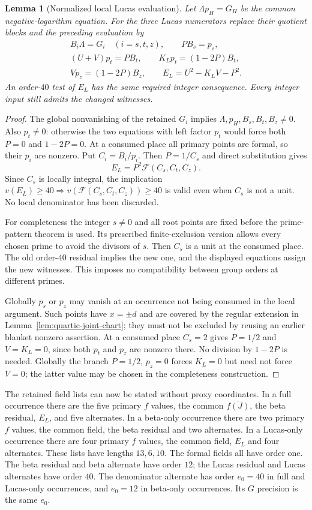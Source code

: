 \documentclass[11pt]{article}
\newtheorem{lemma}[theorem]{Lemma}
\theoremstyle{definition}
\theoremstyle{remark}
\begin{document}
\begin{lemma}[Normalized local Lucas evaluation]
\label{lem:quartic-normalized-lucas}
Let $\Lambda p_H=G_H$ be the common negative-logarithm equation. For the
three Lucas numerators replace their quotient blocks and the preceding
evaluation by
\begin{gather*}
 B_i\Lambda=G_i\quad(i=s,t,z),\qquad P B_s=p_s,\\
 (U+V)p_t=P B_t,\qquad K_Lp_t=(1-2P)B_t,\\
 Vp_z=(1-2P)B_z,\qquad E_L=U^2-K_LV-P^2.
\end{gather*}
An order-$40$ test of $E_L$ has the same required integer consequence.
Every integer input still admits the changed witnesses.
\end{lemma}
\begin{proof}
The global nonvanishing of the retained $G_i$ implies
$\Lambda,p_H,B_s,B_t,B_z\ne0$. Also $p_t\ne0$: otherwise the two
equations with left factor $p_t$ would force both $P=0$ and $1-2P=0$.
At a consumed place all primary points are formal, so their $p_i$ are
nonzero. Put $C_i=B_i/p_i$. Then $P=1/C_s$ and direct substitution gives
\[
 E_L=P^2\mathcal F(C_s,C_t,C_z).
\]
Since $C_s$ is locally integral, the implication
$v(E_L)\ge40\Rightarrow v(\mathcal F(C_s,C_t,C_z))\ge40$ is valid even
when $C_s$ is not a unit. No local denominator has been discarded.

For completeness the integer $s\ne0$ and all root points are fixed before
the prime-pattern theorem is used. Its prescribed finite-exclusion version
allows every chosen prime to avoid the divisors of $s$. Then $C_s$ is a
unit at the consumed place. The old order-$40$ residual implies the new
one, and the displayed equations assign the new witnesses. This imposes
no compatibility between group orders at different primes.

Globally $p_s$ or $p_z$ may vanish at an occurrence not being consumed in
the local argument. Such points have $x=\pm d$ and are covered by the
regular extension in Lemma~\ref{lem:quartic-joint-chart}; they must not be
excluded by reusing an earlier blanket nonzero assertion. At a consumed
place $C_s=2$ gives $P=1/2$ and $V=K_L=0$, since both $p_t$ and $p_z$
are nonzero there. No division by $1-2P$ is needed. Globally the branch
$P=1/2$, $p_z=0$ forces $K_L=0$ but need not force $V=0$; the latter
value may be chosen in the completeness construction.
\end{proof}

The retained field lists can now be stated without proxy coordinates.
In a full occurrence there are the five primary $f$ values, the common
$\overline{f(J)}$, the beta residual, $E_L$, and five alternates.
In a beta-only occurrence there are two primary $f$ values, the common
field, the beta residual and two alternates. In a Lucas-only occurrence
there are four primary $f$ values, the common field, $E_L$ and four
alternates. These lists have lengths $13,6,10$. The formal fields all have
order one. The beta residual and beta alternate have order $12$; the
Lucas residual and Lucas alternates have order $40$. The denominator
alternate has order $e_0=40$ in full and Lucas-only occurrences, and
$e_0=12$ in beta-only occurrences. Its $G$ precision is the same $e_0$.
\end{document}

